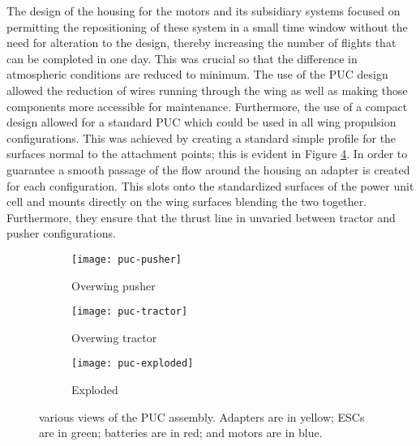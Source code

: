 \documentclass[../../main.tex]{subfiles}
\begin{document}

The design of the housing for the motors and its subsidiary systems focused on permitting the repositioning of these system in a small time window without the need for alteration to the design, thereby increasing the number of flights that can be completed in one day.
This was crucial so that the difference in atmospheric conditions are reduced to minimum. 
The use of the PUC design allowed the reduction of wires running through the wing as well as making those components more accessible for maintenance.
Furthermore, the use of a compact design allowed for a standard PUC which could be used in all wing propulsion configurations.
This was achieved by creating a standard simple profile for the surfaces normal to the attachment points; this is evident in Figure \ref{fig:puc-assemblies}.
In order to guarantee a smooth passage of the flow around the housing an adapter is created for each configuration.
This slots onto the standardized surfaces of the power unit cell and mounts directly on the wing surfaces blending the two together.
Furthermore, they ensure that the thrust line in unvaried between tractor and pusher configurations. 


\begin{figure}[H]
    \centering
    \begin{subfigure}[b]{0.49\columnwidth}
        \centering
        \texttt{[image: puc-pusher]}
        \caption{Overwing pusher}
        \label{fig:puc-assemblies:pusher}
    \end{subfigure}
    \hfill
    \begin{subfigure}[b]{0.49\columnwidth}
        \centering
        \texttt{[image: puc-tractor]}
        \caption{Overwing tractor}
        \label{fig:puc-assemblies:tractor}
    \end{subfigure}

    \begin{subfigure}[b]{0.7\columnwidth}
        \centering
        \texttt{[image: puc-exploded]}
        \caption{Exploded}
        \label{fig:puc-assemblies:exploded}
    \end{subfigure}
    
    \caption{
        various views of the PUC assembly.
        Adapters are in yellow; ESCs are in green; batteries are in red; and motors are in blue.
    }
    \label{fig:puc-assemblies}
\end{figure} 
\end{document}
